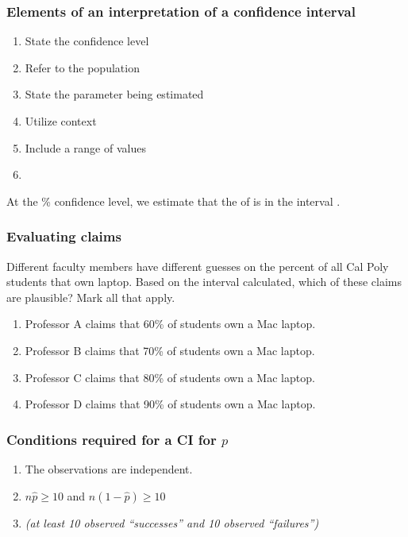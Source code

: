 \begin{frame}
\frametitle{Elements of an interpretation of a confidence interval}

\begin{enumerate}
    \item
    State the confidence level
    \item
    Refer to the population
    \item
    State the parameter being estimated
    \item
    Utilize context
    \item
    Include a range of values
    \item[]
\end{enumerate}

At the  \% confidence level, we estimate that the   of  is in the interval .
\end{frame}

\begin{frame}
\frametitle{Evaluating claims}
\begin{clicker}{Different faculty members have different guesses on the percent of all Cal Poly students that own laptop.  Based on the interval calculated, which of these claims are plausible?  Mark all that apply.}
\begin{enumerate}
    \item
    Professor A claims that 60\% of students own a Mac laptop.
    \item
    Professor B claims that 70\% of students own a Mac laptop.
    \item
    Professor C claims that 80\% of students own a Mac laptop.
    \item
    Professor D claims that 90\% of students own a Mac laptop.
\end{enumerate}
\end{clicker}
\end{frame}



\begin{frame}[label=assumptions]
\frametitle{Conditions required for a CI for $p$}
    \begin{enumerate}
        \item
        The observations are independent.
        \hyperlink{independentobs}{}
        \item
        $n\hat{p} \geq 10 $ and $n(1-\hat{p}) \geq 10$
        \item[]
        \emph{(at least 10 observed ``successes'' and 10 observed ``failures'')}
    \end{enumerate}
\end{frame}




